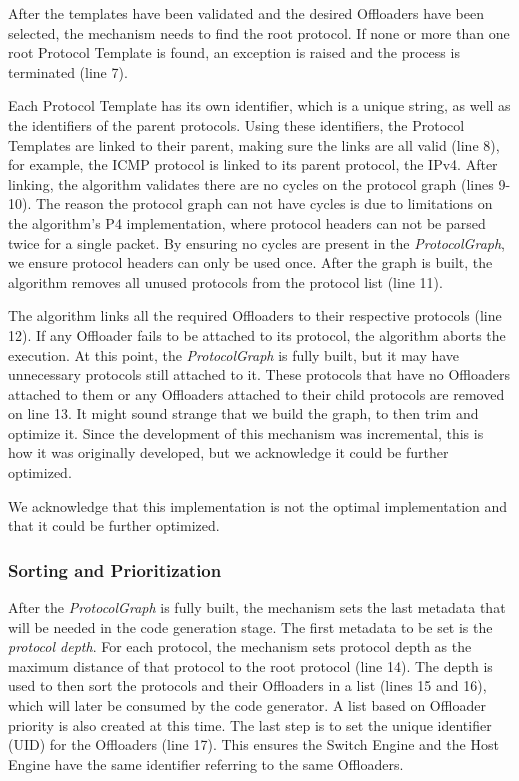 After the templates have been validated and the desired Offloaders have been selected, the mechanism needs to find the root protocol. If none or more than one root Protocol Template is found, an exception is raised and the process is terminated (line 7).

Each Protocol Template has its own identifier, which is a unique string, as well as the identifiers of the parent protocols. Using these identifiers, the Protocol Templates are linked to their parent, making sure the links are all valid (line 8), for example, the ICMP protocol is linked to its parent protocol, the IPv4. After linking, the algorithm validates there are no cycles on the protocol graph (lines 9-10). The reason the protocol graph can not have cycles is due to limitations on the algorithm's P4 implementation, where protocol headers can not be parsed twice for a single packet. By ensuring no cycles are present in the \textit{ProtocolGraph}, we ensure protocol headers can only be used once. After the graph is built, the algorithm removes all unused protocols from the protocol list (line 11).

The algorithm links all the required Offloaders to their respective protocols (line 12). If any Offloader fails to be attached to its protocol, the algorithm aborts the execution. At this point, the \textit{ProtocolGraph} is fully built, but it may have unnecessary protocols still attached to it. These protocols that have no Offloaders attached to them or any Offloaders attached to their child protocols are removed on line 13. It might sound strange that we build the graph, to then trim and optimize it. Since the development of this mechanism was incremental, this is how it was originally developed, but we acknowledge it could be further optimized.

We acknowledge that this implementation is not the optimal implementation and that it could be further optimized.

\subsubsection*{Sorting and Prioritization}

After the \textit{ProtocolGraph} is fully built, the mechanism sets the last metadata that will be needed in the code generation stage. The first metadata to be set is the \textit{protocol depth}. For each protocol, the mechanism sets protocol depth as the maximum distance of that protocol to the root protocol (line 14). The depth is used to then sort the protocols and their Offloaders in a list (lines 15 and 16), which will later be consumed by the code generator. A list based on Offloader priority is also created at this time. The last step is to set the unique identifier (UID) for the Offloaders (line 17). This ensures the Switch Engine and the Host Engine have the same identifier referring to the same Offloaders.

